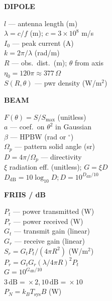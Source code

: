 \documentclass[6pt,letterpaper]{article}
\newcommand{\shead}[3]{%
  \noindent\colorbox{#1}{\parbox{\dimexpr\linewidth-2\fboxsep\relax}%
  {\color{#2}\bfseries\fontsize{6}{7}\selectfont #3}}\vspace{0.3pt}}
\begin{document}
\vfill
\vspace{1pt}
\noindent
\begin{minipage}[t]{0.19\linewidth}
\shead{purplebg}{purple}{DIPOLE}
\begin{ebox}
$l$ --- antenna length (m)\\
$\lambda\!=\!c/f$ (m); $c\!=\!3\!\times\!10^8$ m/s\\
$I_0$ --- peak current (A)\\
$k\!=\!2\pi/\lambda$ (rad/m)\\
$R$ --- obs.\ dist.\ (m); $\theta$ from axis\\
$\eta_0\!=\!120\pi\!\approx\!377\,\Omega$\\
$S(R,\theta)$ --- pwr density (W/m$^2$)
\end{ebox}
\end{minipage}\hfill
\begin{minipage}[t]{0.19\linewidth}
\shead{greenbg}{green}{BEAM}
\begin{ebox}
$F(\theta)\!=\!S/S_{\max}$ (unitless)\\
$a$ --- coef.\ on $\theta^2$ in Gaussian\\
$\beta$ --- HPBW (rad or $^\circ$)\\
$\Omega_p$ --- pattern solid angle (sr)\\
$D\!=\!4\pi/\Omega_p$ --- directivity\\
$\xi$ radiation eff. (unitless); $G\!=\!\xi D$\\
$D_\text{dB}\!=\!10\log_{10}D$;\,$D\!=\!10^{D_\text{dB}/10}$
\end{ebox}
\end{minipage}\hfill
\begin{minipage}[t]{0.19\linewidth}
\shead{pinkbg}{pink}{FRIIS / dB}
\begin{ebox}
$P_t$ --- power transmitted (W)\\
$P_r$ --- power received (W)\\
$G_t$ --- transmit gain (linear)\\
$G_r$ --- receive gain (linear)\\
$S_r\!=\!G_tP_t/(4\pi R^2)$ (W/m$^2$)\\
$P_r\!=\!G_tG_r(\lambda/4\pi R)^2 P_t$\\
$G\!=\!10^{G_\text{dB}/10}$\\
$3\,\text{dB}\!=\!{\times}2$,\,$10\,\text{dB}\!=\!{\times}10$\\
$P_N\!=\!k_B T_\text{sys} B$ (W)
\end{ebox}
\end{minipage}\hfill
\end{document}
